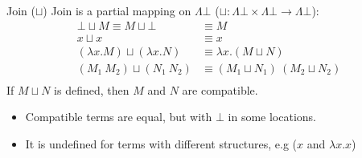\begin{definitionbox}{Join ($\sqcup$)}
	Join is a partial mapping on $\Lambda \bot$ ($\sqcup : \Lambda \bot \times \Lambda \bot \to \Lambda \bot$):
	\[\begin{split}
			\bot \sqcup M \equiv M \sqcup \bot & \equiv M \\
			x \sqcup x & \equiv x \\
			(\lambda x . M) \sqcup (\lambda x . N) & \equiv \lambda x . (M \sqcup N) \\
			(M_1 \ M_2) \sqcup (N_1 \ N_2) & \equiv (M_1 \sqcup N_1) \ (M_2 \sqcup N_2) \\
		\end{split}\]
	If $M \sqcup N$ is defined, then $M$ and $N$ are compatible.
	\begin{itemize}
		\item Compatible terms are equal, but with $\bot$ in some locations.
		\item It is undefined for terms with different structures, e.g ($x$ and $\lambda x . x$)
	\end{itemize}
\end{definitionbox}

